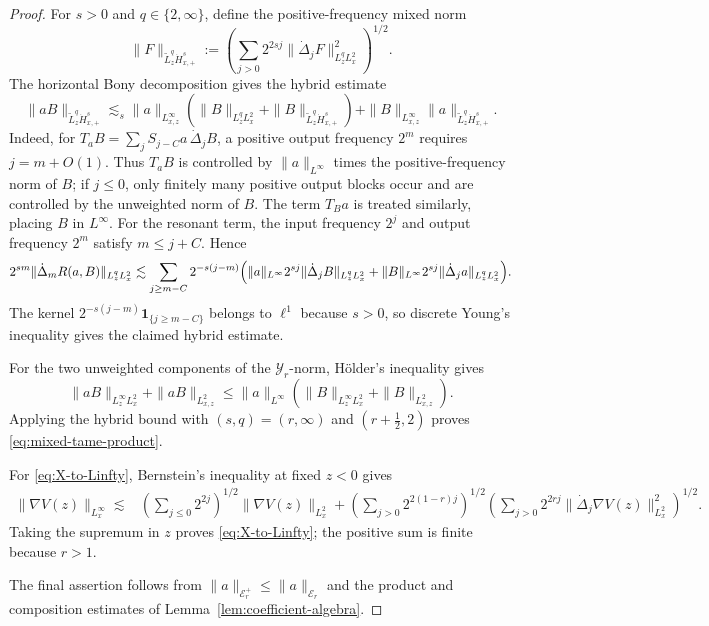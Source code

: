 \documentclass[12pt]{amsart}
\theoremstyle{remark}
\theoremstyle{definition}
\numberwithin{equation}{section}
\begin{document}
\begin{proof}
For \(s>0\) and \(q\in\{2,\infty\}\), define the positive-frequency mixed norm
\[
 \|F\|_{\widetilde L^q_z\dot H^s_{x,+}} := \left( \sum_{j>0} 2^{2sj} \|\dot\Delta_jF\|_{L^q_zL^2_x}^2 \right)^{1/2}.
\]
The horizontal Bony decomposition gives the hybrid estimate
\begin{equation*}
 \|aB\|_{\widetilde L^q_z\dot H^s_{x,+}} \lesssim_s \|a\|_{L^\infty_{x,z}} \left( \|B\|_{L^q_zL^2_x} + \|B\|_{\widetilde L^q_z\dot H^s_{x,+}} \right)+ \|B\|_{L^\infty_{x,z}} \|a\|_{\widetilde L^q_z\dot H^s_{x,+}}.
\end{equation*}
Indeed, for \(T_aB=\sum_jS_{j-C}a\,\dot\Delta_jB\), a positive output
frequency \(2^m\) requires \(j=m+O(1)\). Thus
\(T_aB\) is controlled by \(\|a\|_{L^\infty}\) times the
positive-frequency norm of \(B\); if \(j\leq0\), only finitely many
positive output blocks occur and are controlled by the unweighted
norm of \(B\). The term \(T_Ba\) is treated similarly, placing \(B\)
in \(L^\infty\). For the resonant term, the input frequency \(2^j\) and output
frequency \(2^m\) satisfy \(m\leq j+C\). Hence
\begin{align*}
2^{sm}\|\dot\Delta_mR(a,B)\|_{L^q_zL^2_x} 
\lesssim 
\sum_{j\geq m-C}2^{-s(j-m)} 
\Bigl(
\|a\|_{L^\infty}2^{sj}\|\dot\Delta_jB\|_{L^q_zL^2_x}+  
\|B\|_{L^\infty}  
2^{sj}\|\dot\Delta_ja\|_{L^q_zL^2_x} 
\Bigr).
\end{align*}
The kernel \(2^{-s(j-m)}\mathbf 1_{\{j\geq m-C\}}\) belongs to
\(\ell^1\) because \(s>0\), so discrete Young's inequality gives the
claimed hybrid estimate.

For the two unweighted components of the \(\mathcal Y_r\)-norm, Hölder's inequality gives
\begin{equation*}
 \|aB\|_{L^\infty_zL^2_x} + \|aB\|_{L^2_{x,z}} \leq \|a\|_{L^\infty} \left( \|B\|_{L^\infty_zL^2_x} + \|B\|_{L^2_{x,z}} \right).
\end{equation*}
Applying the hybrid bound with \((s,q)=(r,\infty)\) and
\((r+\frac12,2)\) proves \eqref{eq:mixed-tame-product}.

For \eqref{eq:X-to-Linfty}, Bernstein's inequality at fixed \(z<0\) gives
\begin{align*}
 \|\nabla V(z)\|_{L^\infty_x}
 \lesssim{}&
 \left(\sum_{j\leq0}2^{2j}\right)^{1/2}\|\nabla V(z)\|_{L^2_x}+\left(\sum_{j>0}2^{2(1-r)j}\right)^{1/2}
 \left(\sum_{j>0}2^{2rj}\|\dot\Delta_j\nabla V(z)\|_{L^2_x}^2\right)^{1/2}.
\end{align*}
Taking the supremum in \(z\) proves \eqref{eq:X-to-Linfty}; the positive
sum is finite because \(r>1\).

The final assertion follows from
\(\|a\|_{\mathcal E_r^+}\leq\|a\|_{\mathcal E_r}\) and the product and
composition estimates of Lemma~\ref{lem:coefficient-algebra}.
\end{proof}
\end{document}
